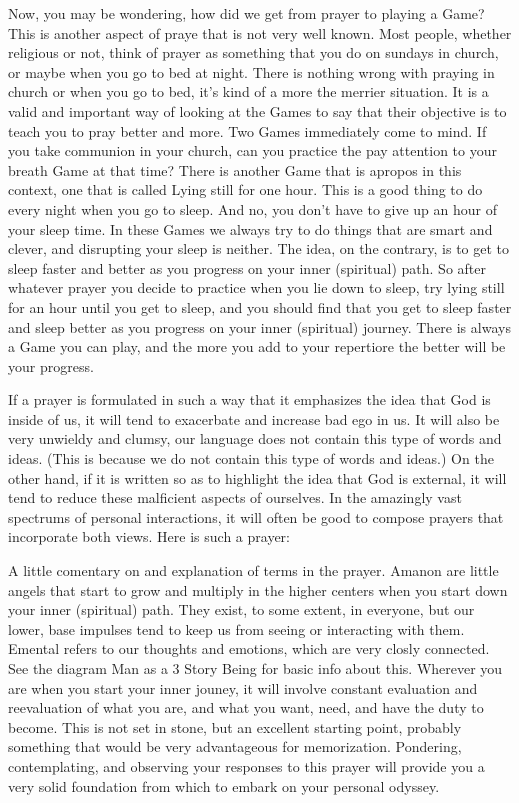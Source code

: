 \documentclass[12pt,letterpaper]{book}
\begin{document}
Now, you may be wondering, how did we get from prayer to playing a Game? This is another aspect of praye that is not very well known. Most people, whether religious or not, think of prayer as something that you do on sundays in church, or maybe when you go to bed at night. There is nothing wrong with praying in church or when you go to bed, it's kind of a more the merrier situation. It is a valid and important way of looking at the Games to say that their objective is to teach you to pray better and more. Two Games immediately come to mind. If you take communion in your church, can you practice the pay attention to your breath Game at that time? There is another Game that is apropos in this context, one that is called Lying still for one hour. This is a good thing to do every night when you go to sleep. And no, you don't have to give up an hour of your sleep time. In these Games we always try to do things that are smart and clever, and disrupting your sleep is neither. The idea, on the contrary, is to get to sleep faster and better as you progress on your inner (spiritual) path. So after whatever prayer you decide to practice when you lie down to sleep, try lying still for an hour until you get to sleep, and you should find that you get to sleep faster and sleep better as you progress on your inner (spiritual) journey. There is always a Game you can play, and the more you add to your repertiore the better will be your progress.

If a prayer is formulated in such a way that it emphasizes the idea that God is inside of us, it will tend to exacerbate and increase bad ego in us. It will also be very unwieldy and clumsy, our language does not contain this type of words and ideas. (This is because we do not contain this type of words and ideas.) On the other hand, if it is written so as to highlight the idea that God is external, it will tend to reduce these malficient aspects of ourselves. In the amazingly vast spectrums of personal interactions, it will often be good to compose prayers that incorporate both views. Here is such a prayer:

A little comentary on and explanation of terms in the prayer. Amanon are little angels that start to grow and multiply in the higher centers when you start down your inner (spiritual) path. They exist, to some extent, in everyone, but our lower, base impulses tend to keep us from seeing or interacting with them. Emental refers to our thoughts and emotions, which are very closly connected. See the diagram Man as a 3 Story Being for basic info about this. Wherever you are when you start your inner jouney, it will involve constant evaluation and reevaluation of what you are, and what you want, need, and have the duty to become. This is not set in stone, but an excellent starting point, probably something that would be very advantageous for memorization. Pondering, contemplating, and observing your responses to this prayer will provide you a very solid foundation from which to embark on your personal odyssey. 
\end{document}
